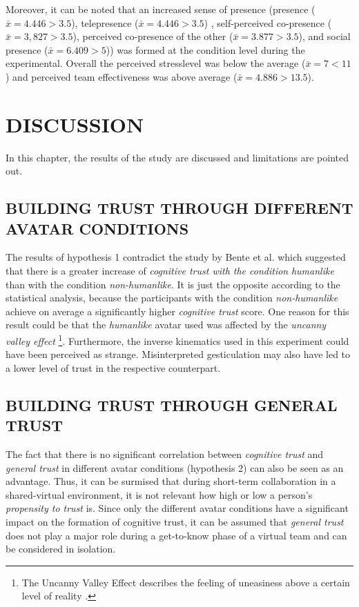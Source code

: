 \documentclass[sigchi]{acmart}
\begin{document}
Moreover, it can be noted that an increased sense of presence (presence ($\bar{x} = 4.446 > 3.5$), telepresence ($\bar{x} = 4.446 > 3.5$) , self-perceived co-presence ($\bar{x} = 3, 827 > 3.5$), perceived co-presence of the other ($\bar{x} = 3.877 > 3.5$), and social presence ($\bar{x} = 6.409 > 5$)) was formed at the condition level during the experimental. Overall the perceived stresslevel was below the average ($\bar{x} = 7 < 11$) and perceived team effectiveness was above average ($\bar{x} = 4.886 > 13.5$).

\section{DISCUSSION}
In this chapter, the results of the study are discussed and limitations are pointed out.

\subsection{BUILDING TRUST THROUGH DIFFERENT AVATAR CONDITIONS}
The results of hypothesis 1 contradict the study by Bente et al. \cite{bente2004social} which suggested that there is a greater increase of \textit{cognitive trust with the condition} \textit{humanlike} than with the condition \textit{non-humanlike}. It is just the opposite according to the statistical analysis, because the participants with the condition \textit{non-humanlike} achieve on average a significantly higher \textit{cognitive trust} score.
One reason for this result could be that the \textit{humanlike} avatar used was affected by the \textit{uncanny valley effect} \footnote{The Uncanny Valley Effect describes the feeling of uneasiness above a certain level of reality \citep[pp. 352-353]{guest2011uncanny}.}.
Furthermore, the inverse kinematics used in this experiment could have been perceived as strange. Misinterpreted gesticulation may also have led to a lower level of trust in the respective counterpart.

\subsection{BUILDING TRUST THROUGH GENERAL TRUST}
The fact that there is no significant correlation between \textit{cognitive trust} and \textit{general trust} in different avatar conditions (hypothesis 2) can also be seen as an advantage.
Thus, it can be surmised that during short-term collaboration in a shared-virtual environment, it is not relevant how high or low a person's \textit{propensity to trust} is. 
Since only the different avatar conditions have a significant impact on the formation of cognitive trust, it can be assumed that \textit{general trust} does not play a major role during a get-to-know phase of a virtual team and can be considered in isolation.
\end{document}
